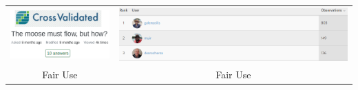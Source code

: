 \documentclass[compress, aspectratio=169]{beamer}
\begin{document}
\begin{frame}
\begin{columns}
\begin{column}{0.6\textwidth}
\begin{tabular}{cc}
	\end{tabular}
	\end{column}
	\end{columns}
	\begin{tabular}{cc}
\includegraphics[scale=0.4]{cvbrag.png} & \includegraphics[scale=0.4]{leaderboard.png}\\
\tiny Fair Use & \tiny Fair Use \\
	\end{tabular}
\end{frame}
\end{document}
